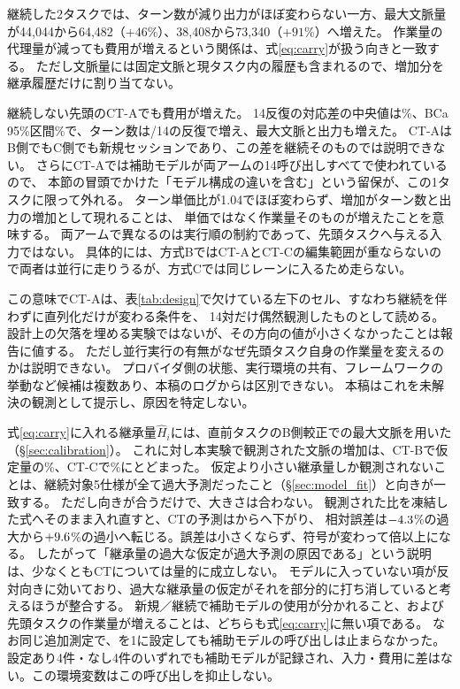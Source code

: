 \documentclass[a4paper,11pt]{article}
\newcommand{\spec}[1]{\texttt{\detokenize{#1}}}
\begin{document}
\begin{table}[!htbp]
\centering\small
\caption{CTのタスク別。ターン差と費用相対差は14反復の対応差の中央値、最大文脈は各アームの中央値。ターン単価比はモデル構成の違いを含む量であり、履歴処理の単価ではない。}
\label{tab:mechanism}
\end{table}

継続した2タスクでは、ターン数が減り出力がほぼ変わらない一方、最大文脈量が44,044から64,482（$+46$\%）、38,408から73,340（$+91$\%）へ増えた。
作業量の代理量が減っても費用が増えるという関係は、式\eqref{eq:carry}が扱う向きと一致する。
ただし文脈量には固定文脈と現タスク内の履歴も含まれるので、増加分を継承履歴だけに割り当てない。

継続しない先頭のCT-Aでも費用が増えた。
14反復の対応差の中央値は\CTAMedian\%、BCa 95\%区間\CTACI\%で、ターン数は\CTATurnUp/14の反復で増え、最大文脈と出力も増えた。
CT-AはB側でもC側でも新規セッションであり、この差を継続そのものでは説明できない。
さらにCT-Aでは補助モデルが両アームの14呼び出しすべてで使われているので、
本節の冒頭でかけた「モデル構成の違いを含む」という留保が、この1タスクに限って外れる。
ターン単価比が1.04でほぼ変わらず、増加がターン数と出力の増加として現れることは、
単価ではなく作業量そのものが増えたことを意味する。
両アームで異なるのは実行順の制約であって、先頭タスクへ与える入力ではない。
具体的には、方式BではCT-AとCT-Cの編集範囲が重ならないので両者は並行に走りうるが、方式Cでは同じレーンに入るため走らない。

この意味でCT-Aは、表\ref{tab:design}で欠けている左下のセル、すなわち継続を伴わずに直列化だけが変わる条件を、
14対だけ偶然観測したものとして読める。設計上の欠落を埋める実験ではないが、その方向の値が小さくなかったことは報告に値する。
ただし並行実行の有無がなぜ先頭タスク自身の作業量を変えるのかは説明できない。
プロバイダ側の状態、実行環境の共有、フレームワークの挙動など候補は複数あり、本稿のログからは区別できない。
本稿はこれを未解決の観測として提示し、原因を特定しない。

式\eqref{eq:carry}に入れる継承量$\widehat H_i$には、直前タスクのB側較正での最大文脈を用いた（\S\ref{sec:calibration}）。
これに対し本実験で観測された文脈の増加は、CT-Bで仮定量の\CarryShareB\%、CT-Cで\CarryShareC\%にとどまった。
仮定より小さい継承量しか観測されないことは、継続対象5仕様が全て過大予測だったこと（\S\ref{sec:model_fit}）と向きが一致する。
ただし向きが合うだけで、大きさは合わない。
観測された比を凍結した式へそのまま入れ直すと、CTの予測は\SubHatFrozen{}から\SubHatObserved{}へ下がり、
相対誤差は$-4.3$\%の過大から$+9.6$\%の過小へ転じる。誤差は小さくならず、符号が変わって倍以上になる。
したがって「継承量の過大な仮定が過大予測の原因である」という説明は、少なくともCTについては量的に成立しない。
モデルに入っていない項が反対向きに効いており、過大な継承量の仮定がそれを部分的に打ち消していると考えるほうが整合する。
新規／継続で補助モデルの使用が分かれること、および先頭タスクの作業量が増えることは、どちらも式\eqref{eq:carry}に無い項である。
なお同じ追加測定で、\spec{DISABLE_NON_ESSENTIAL_MODEL_CALLS}を1に設定しても補助モデルの呼び出しは止まらなかった。
設定あり4件・なし4件のいずれでも補助モデルが記録され、入力・費用に差はない。この環境変数はこの呼び出しを抑止しない。
\end{document}
